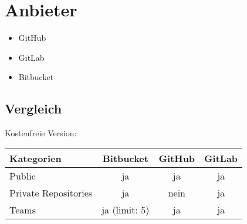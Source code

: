 \section{Anbieter}
\begin{frame}
\begin{itemize}
	\item GitHub
	\item GitLab
	\item Bitbucket
\end{itemize}
\end{frame}
\subsection{Vergleich}
\begin{frame}
	Kostenfreie Version:\vspace*{1em}\\
\begin{center}
	\begin{tabular}{l|c|c|c}
		Kategorien & Bitbucket & GitHub & GitLab \\\hline
		Public & ja & ja & ja\\
		Private Repositories & ja & nein & ja \\
		Teams & ja (limit: 5) & ja & ja\\
	\end{tabular}
\end{center}
\end{frame}